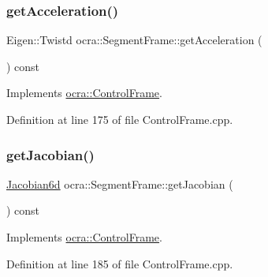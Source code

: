 \hypertarget{classocra_1_1SegmentFrame_aa8f7f9544b59da591d94ac8e6a8a9e5d}{}\label{classocra_1_1SegmentFrame_aa8f7f9544b59da591d94ac8e6a8a9e5d} 
\subsubsection{\texorpdfstring{get\+Acceleration()}{getAcceleration()}}
{\footnotesize\ttfamily Eigen\+::\+Twistd ocra\+::\+Segment\+Frame\+::get\+Acceleration (\begin{DoxyParamCaption}{ }\end{DoxyParamCaption}) const\hspace{0.3cm}{\ttfamily [virtual]}}



Implements \hyperlink{classocra_1_1ControlFrame_a0ceb7cd7c3fe90fa0ef311b96a6f5c88}{ocra\+::\+Control\+Frame}.



Definition at line 175 of file Control\+Frame.\+cpp.

\hypertarget{classocra_1_1SegmentFrame_a1ece38dd51a3331dfe3de7911ad9291e}{}\label{classocra_1_1SegmentFrame_a1ece38dd51a3331dfe3de7911ad9291e} 
\subsubsection{\texorpdfstring{get\+Jacobian()}{getJacobian()}}
{\footnotesize\ttfamily \hyperlink{namespaceocra_ac73b015f9f7cb0c252c4d5c4800f559a}{Jacobian6d} ocra\+::\+Segment\+Frame\+::get\+Jacobian (\begin{DoxyParamCaption}{ }\end{DoxyParamCaption}) const\hspace{0.3cm}{\ttfamily [virtual]}}



Implements \hyperlink{classocra_1_1ControlFrame_a14e0b855979be5dbd360314f25191e77}{ocra\+::\+Control\+Frame}.



Definition at line 185 of file Control\+Frame.\+cpp.

\hypertarget{classocra_1_1SegmentFrame_a3a14b77753ad98507db9968b33c582e4}{}\label{classocra_1_1SegmentFrame_a3a14b77753ad98507db9968b33c582e4} 
